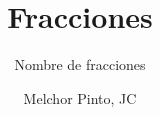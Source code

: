 \documentclass{guia}
\title{Fracciones}
\subtitle{Nombre de fracciones}
\author{Melchor Pinto, JC}
\begin{document}
%
\begin{questions}
\questionboxed{}
\end{questions}
\end{document}
